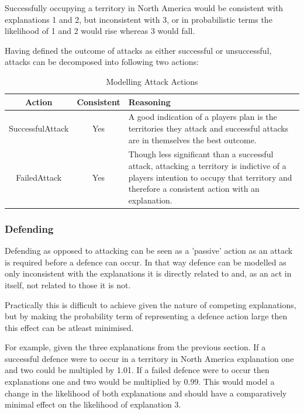 \documentclass[parskip]{cs4rep}
\begin{document}
Successfully occupying a territory in North America would be consistent with explanations 1 and 2, but inconsistent with 3, or in probabilistic terms the likelihood of 1 and 2 would rise whereas 3 would fall.

Having defined the outcome of attacks as either successful or unsuccessful, attacks can be decomposed into following two actions: 

\begin{table}[ht]
\centering
\begin{tabular}{|c|c|p{8cm}|}
\hline 
\textbf{Action} & \textbf{Consistent}  & \textbf{Reasoning} \\ 
\hline 
SuccessfulAttack & Yes & A good indication of a players plan is the territories they attack and successful attacks are in themselves the best outcome. \\ 
\hline 
FailedAttack & Yes & Though less significant than a successful attack, attacking a territory is indictive of a players intention to occupy that territory and therefore a consistent action with an explanation.\\ 
\hline
\end{tabular}
\caption{Modelling Attack Actions}
\label{table:attack-defend-modelling}
\end{table}

\newpage

\subsubsection{Defending}

Defending as opposed to attacking can be seen as a 'passive' action as an attack is required before a defence can occur. In that way defence can be modelled as only inconsistent with the explanations it is directly related to and, as an act in itself, not related to those it is not. 

Practically this is difficult to achieve given the nature of competing explanations, but by making the probability term of representing a defence action large then this effect can be atleast minimised.

For example, given the three explanations from the previous section. If a successful defence were to occur in a territory in North America explanation one and two could be multipled by 1.01. If a failed defence were to occur then explanations one and two would be multiplied by 0.99. This would model a change in the likelihood of both explanations and should have a comparatively minimal effect on the likelihood of explanation 3. 
\end{document}
